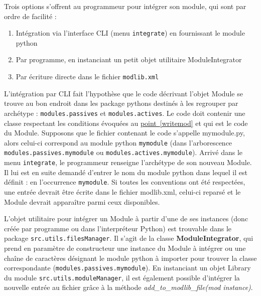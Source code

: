\documentclass[]{article}
\newcommand{\wordlink}[2]{\hyperref[#1]{#2~\ref{#1}}}
\begin{document}
\normalsize

Trois options s'offrent au programmeur pour intégrer son module, qui sont par ordre de facilité :

\begin{enumerate}
\item Intégration via l'interface CLI (menu \texttt{integrate}) en fournissant le module python
\item Par programme, en instanciant un petit objet utilitaire ModuleIntegrator
\item Par écriture directe dans le fichier \texttt{modlib.xml}
\end{enumerate}

\par L'intégration par CLI fait l'hypothèse que le code décrivant l'objet Module se trouve au bon endroit dans les package pythons destinés à les regrouper par archétype : \texttt{modules.passives} et \texttt{modules.actives}. Le code doit contenir une classe respectant les conditions évoquées au \wordlink{writemod}{point} et qui est le code du Module. Supposons que le fichier contenant le code s'appelle mymodule.py, alors celui-ci correspond au module python \texttt{mymodule} (dans l'arborescence \texttt{modules.passives.mymodule} ou \texttt{modules.actives.mymodule}). Arrivé dans le menu \texttt{integrate}, le programmeur renseigne l'archétype de son nouveau Module. Il lui est en suite demandé d'entrer le nom du module python dans lequel il est définit : en l'occurrence \texttt{mymodule}. Si toutes les conventions ont été respectées, une entrée devrait être écrite dans le fichier modlib.xml, celui-ci reparsé et le Module devrait apparaître parmi ceux disponibles.\\

\par L'objet utilitaire pour intégrer un Module à partir d'une de ses instances (donc créée par programme ou dans l'interpréteur Python) est trouvable dans le package \texttt{src.utils.filesManager}. Il s'agit de la classe \textbf{ModuleIntegrator}, qui prend en paramètre de constructeur une instance du Module à intégrer ou une chaîne de caractères désignant le module python à importer pour trouver la classe correspondante (\texttt{modules.passives.mymodule}). En instanciant un objet Library du module \texttt{src.utils.moduleManager}, il est également possible d'intégrer la nouvelle entrée au fichier grâce à la méthode \textit{add\_to\_modlib\_file(mod instance)}.\\
\end{document}
